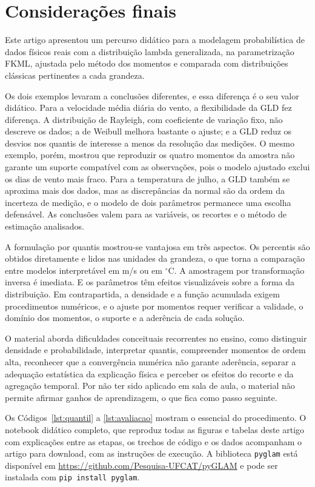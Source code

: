 
\section{Considerações finais}\label{sec:consideracoes}

Este artigo apresentou um percurso didático para a modelagem probabilística de dados físicos reais com a distribuição lambda generalizada, na parametrização FKML, ajustada pelo método dos momentos e comparada com distribuições clássicas pertinentes a cada grandeza.

Os dois exemplos levaram a conclusões diferentes, e essa diferença é o seu valor didático. Para a velocidade média diária do vento, a flexibilidade da GLD fez diferença. A distribuição de Rayleigh, com coeficiente de variação fixo, não descreve os dados; a de Weibull melhora bastante o ajuste; e a GLD reduz os desvios nos quantis de interesse a menos da resolução das medições. O mesmo exemplo, porém, mostrou que reproduzir os quatro momentos da amostra não garante um suporte compatível com as observações, pois o modelo ajustado exclui os dias de vento mais fraco. Para a temperatura de julho, a GLD também se aproxima mais dos dados, mas as discrepâncias da normal são da ordem da incerteza de medição, e o modelo de dois parâmetros permanece uma escolha defensável. As conclusões valem para as variáveis, os recortes e o método de estimação analisados.

A formulação por quantis mostrou-se vantajosa em três aspectos. Os percentis são obtidos diretamente e lidos nas unidades da grandeza, o que torna a comparação entre modelos interpretável em m/s ou em $^\circ$C. A amostragem por transformação inversa é imediata. E os parâmetros têm efeitos visualizáveis sobre a forma da distribuição. Em contrapartida, a densidade e a função acumulada exigem procedimentos numéricos, e o ajuste por momentos requer verificar a validade, o domínio dos momentos, o suporte e a aderência de cada solução.

O material aborda dificuldades conceituais recorrentes no ensino, como distinguir densidade e probabilidade, interpretar quantis, compreender momentos de ordem alta, reconhecer que a convergência numérica não garante aderência, separar a adequação estatística da explicação física e perceber os efeitos do recorte e da agregação temporal. Por não ter sido aplicado em sala de aula, o material não permite afirmar ganhos de aprendizagem, o que fica como passo seguinte.

Os Códigos~\ref{lst:quantil} a \ref{lst:avaliacao} mostram o essencial do procedimento. O notebook didático completo, que reproduz todas as figuras e tabelas deste artigo com explicações entre as etapas, os trechos de código e os dados acompanham o artigo para download, com as instruções de execução. A biblioteca \texttt{pyglam} está disponível em \url{https://github.com/Pesquisa-UFCAT/pyGLAM} e pode ser instalada com \texttt{pip install pyglam}.
